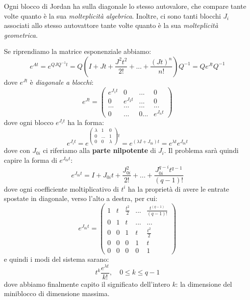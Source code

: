 \documentclass[a4paper,11pt]{article}
\begin{document}
Ogni blocco di Jordan ha sulla diagonale lo stesso autovalore, che compare tante volte quanto è la sua \textit{molteplicità algebrica}.
Inoltre, ci sono tanti blocchi $J_i$ associati allo stesso autovattore tante volte quanto è la sua \textit{molteplicità geometrica}.

\par\smallskip

Se riprendiamo la matrice esponenziale abbiamo:
$$
e^{At} = e^{QJQ^{-1}t} = Q \left( I + Jt + \frac{J^2 t^2}{2!} + ... + \frac{(Jt)^n}{n!} \right) Q^{-1} = Q e^{Jt} Q^{-1}
$$
dove $e^{Jt}$ è \textit{diagonale a blocchi}:
$$
e^{Jt} = \begin{pmatrix}
e^{J_1 t} & 0 & ... & 0 \\
0 & e^{J_2 t} & ... & 0 \\
... & ... & ... & ... \\ 
0 & ... & 0 ... & e^{J_n t}
\end{pmatrix}
$$
dove ogni blocco $e^{J_i t}$ ha la forma:
$$
e^{J_i t} = e^{ \begin{pmatrix}
		\lambda & 1 & 0 \\
		0 & ... & 1 \\ 
		0 & 0 & \lambda
\end{pmatrix} t}
= e^{(\lambda I + J_{0i})t} = e^{\lambda t} e^{J_{0i} t}
$$
dove con $J_{0i}$ ci riferiamo alla \textbf{parte nilpotente} di $J_i$.
Il problema sarà quindi capire la forma di $e^{J_{0i} t}$:
$$
e^{J_{0i} t} = I + J_{0i}t + \frac{J_{0i}^2}{2!} + ... + \frac{J_{0i}^{q - i} t^{q - 1}}{(q - 1)!}
$$
dove ogni coefficiente moltiplicativo di $t^i$ ha la proprietà di avere le entrate spostate in diagonale, verso l'alto a destra, per cui:
$$
e^{J_{0i} t} = \begin{pmatrix}
	1 & t & \frac{t^2}{2} & ... & \frac{t^{(q - 1)}}{(q - 1)!} \\
	0 & 1 & t & ... & ... \\
	0 & 0 & 1 & t & \frac{t^2}{2} \\ 
	0 & 0 & 0 & 1 & t \\
	0 & 0 & 0 & 0 & 1
\end{pmatrix}
$$
e quindi i modi del sistema sarano:
$$
t^k \frac{e^{\lambda t}}{k!}, \quad 0 \leq k \leq q - 1
$$
dove abbiamo finalmente capito il significato dell'intero $k$: la dimensione del miniblocco di dimensione massima.
\end{document}
